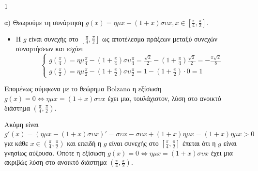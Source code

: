 \begin{ylh}{1}
    \item [Ύλη από εικόνα]
\end{ylh}
\begin{alist}
\item α) Θεωρούμε τη συνάρτηση $g(x)=\eta\mu x-(1+x)\sigma\upsilon x, x \in \left[\frac{\pi}{4}, \frac{\pi}{2}\right]$.
\begin{itemize}
    \item Η $g$ είναι συνεχής στο $\left[\frac{\pi}{4}, \frac{\pi}{2}\right]$ ως αποτέλεσμα πράξεων μεταξύ συνεχών συναρτήσεων και ισχύει
    \[
    \begin{cases}
    g\left(\frac{\pi}{4}\right) = \eta\mu\frac{\pi}{4}-\left(1+\frac{\pi}{4}\right)\sigma\upsilon\frac{\pi}{4} = \frac{\sqrt{2}}{2}-\left(1+\frac{\pi}{4}\right)\frac{\sqrt{2}}{2} = -\frac{\pi\sqrt{2}}{8} \\
    g\left(\frac{\pi}{2}\right) = \eta\mu\frac{\pi}{2}-\left(1+\frac{\pi}{2}\right)\sigma\upsilon\frac{\pi}{2} = 1-\left(1+\frac{\pi}{2}\right)\cdot 0 = 1
    \end{cases}
    \]
\end{itemize}
Επομένως σύμφωνα με το θεώρημα Bolzano η εξίσωση $g(x)=0 \Leftrightarrow \eta\mu x = (1+x)\sigma\upsilon x$ έχει μια, τουλάχιστον, λύση στο ανοικτό διάστημα $\left(\frac{\pi}{4}, \frac{\pi}{2}\right)$.

Ακόμη είναι $g'(x)=(\eta\mu x-(1+x)\sigma\upsilon x)' = \sigma\upsilon x - \sigma\upsilon x+(1+x)\eta\mu x = (1+x)\eta\mu x > 0$ για κάθε $x \in \left(\frac{\pi}{4}, \frac{\pi}{2}\right)$ και επειδή η $g$ είναι συνεχής στο $\left[\frac{\pi}{4}, \frac{\pi}{2}\right]$ έπεται ότι η $g$ είναι γνησίως αύξουσα. Οπότε η εξίσωση $g(x)=0 \Leftrightarrow \eta\mu x=(1+x)\sigma\upsilon x$ έχει μια ακριβώς λύση στο ανοικτό διάστημα $\left(\frac{\pi}{4}, \frac{\pi}{2}\right)$.


\end{alist}
